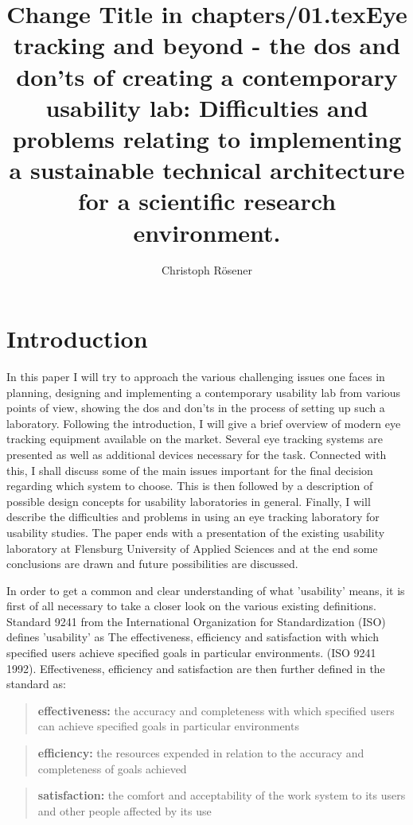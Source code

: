 \documentclass[output=paper]{langsci/langscibook}
\title{Change {T}itle in chapters/01.tex}
\author{%
 Christoph Rösener
\affiliation{Johannes Gutenberg University of Mainz/Germersheim}
}
\title{Eye tracking and beyond - the dos and don'ts of creating a contemporary usability lab: {D}ifficulties and problems relating to implementing a sustainable technical architecture for a scientific research environment.}
\begin{document}
\section{Introduction}

In this paper I will try to approach the various challenging issues one faces in planning, designing and implementing a contemporary usability lab from various points of view, showing the dos and don'ts in the process of setting up such a laboratory. Following the introduction, I will give a brief overview of modern eye tracking equipment available on the market. Several eye tracking systems are presented as well as additional devices necessary for the task. Connected with this, I shall discuss some of the main issues important for the final decision regarding which system to choose. This is then followed by a description of possible design concepts for usability laboratories in general. Finally, I will describe the difficulties and problems in using an eye tracking laboratory for usability studies. The paper ends with a presentation of the existing usability laboratory at Flensburg University of Applied Sciences and at the end some conclusions are drawn and future possibilities are discussed.


In order to get a common and clear understanding of what 'usability' means, it is first of all necessary to take a closer look on the various existing definitions. Standard 9241 from the International Organization for Standardization (ISO) defines 'usability' as {\textquotedbl}The effectiveness, efficiency and satisfaction with which specified users achieve specified goals in particular environments.{\textquotedbl} (ISO 9241 1992). Effectiveness, efficiency and satisfaction are then further defined in the standard as: 


\begin{quote}
\textbf{{\textquotedbl}effectiveness: }the accuracy and completeness with which specified users can achieve specified goals in particular environments
\end{quote}

\begin{quote}
\textbf{efficiency:} the resources expended in relation to the accuracy and completeness of goals achieved
\end{quote}

\begin{quote}
\textbf{satisfaction:} the comfort and acceptability of the work system to its users and other people affected by its use{\textquotedbl}
\end{quote}
\end{document}
